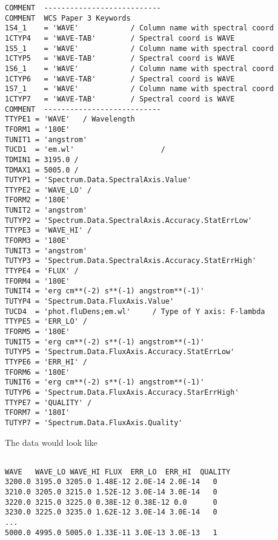 {\begin{verbatim}
COMMENT  ---------------------------
COMMENT  WCS Paper 3 Keywords
1S4_1    = 'WAVE'            / Column name with spectral coord
1CTYP4   = 'WAVE-TAB'        / Spectral coord is WAVE 
1S5_1    = 'WAVE'            / Column name with spectral coord
1CTYP5   = 'WAVE-TAB'        / Spectral coord is WAVE 
1S6_1    = 'WAVE'            / Column name with spectral coord
1CTYP6   = 'WAVE-TAB'        / Spectral coord is WAVE 
1S7_1    = 'WAVE'            / Column name with spectral coord
1CTYP7   = 'WAVE-TAB'        / Spectral coord is WAVE 
COMMENT  ---------------------------
TTYPE1 = 'WAVE'   / Wavelength
TFORM1 = '180E'
TUNIT1 = 'angstrom'
TUCD1  = 'em.wl'                    /
TDMIN1 = 3195.0 /
TDMAX1 = 5005.0 /
TUTYP1 = 'Spectrum.Data.SpectralAxis.Value'
TTYPE2 = 'WAVE_LO' /
TFORM2 = '180E'
TUNIT2 = 'angstrom'
TUTYP2 = 'Spectrum.Data.SpectralAxis.Accuracy.StatErrLow'
TTYPE3 = 'WAVE_HI' /
TFORM3 = '180E'
TUNIT3 = 'angstrom'
TUTYP3 = 'Spectrum.Data.SpectralAxis.Accuracy.StatErrHigh'
TTYPE4 = 'FLUX' /
TFORM4 = '180E'
TUNIT4 = 'erg cm**(-2) s**(-1) angstrom**(-1)'
TUTYP4 = 'Spectrum.Data.FluxAxis.Value'
TUCD4  = 'phot.fluDens;em.wl'     / Type of Y axis: F-lambda
TTYPE5 = 'ERR_LO' /
TFORM5 = '180E'
TUNIT5 = 'erg cm**(-2) s**(-1) angstrom**(-1)'
TUTYP5 = 'Spectrum.Data.FluxAxis.Accuracy.StatErrLow'
TTYPE6 = 'ERR_HI' /
TFORM6 = '180E'
TUNIT6 = 'erg cm**(-2) s**(-1) angstrom**(-1)'
TUTYP6 = 'Spectrum.Data.FluxAxis.Accuracy.StarErrHigh'
TTYPE7 = 'QUALITY' /
TFORM7 = '180I'
TUTYP7 = 'Spectrum.Data.FluxAxis.Quality'
\end{verbatim}
}

The data would look like
{\small
\begin{verbatim}

WAVE   WAVE_LO WAVE_HI FLUX  ERR_LO  ERR_HI  QUALITY
3200.0 3195.0 3205.0 1.48E-12 2.0E-14 2.0E-14   0
3210.0 3205.0 3215.0 1.52E-12 3.0E-14 3.0E-14   0
3220.0 3215.0 3225.0 0.38E-12 0.38E-12 0.0      0                  
3230.0 3225.0 3235.0 1.62E-12 3.0E-14 3.0E-14   0
...
5000.0 4995.0 5005.0 1.33E-11 3.0E-13 3.0E-13   1
\end{verbatim}
}
